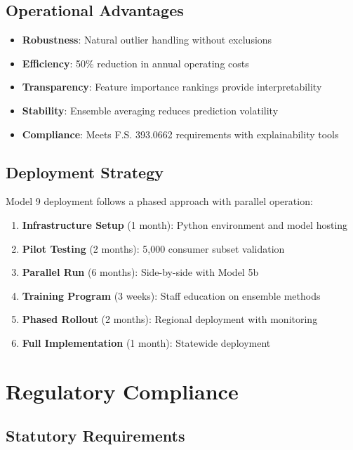 \subsection{Operational Advantages}

\begin{itemize}
    \item \textbf{Robustness}: Natural outlier handling without exclusions
    \item \textbf{Efficiency}: 50\% reduction in annual operating costs
    \item \textbf{Transparency}: Feature importance rankings provide interpretability
    \item \textbf{Stability}: Ensemble averaging reduces prediction volatility
    \item \textbf{Compliance}: Meets F.S. 393.0662 requirements with explainability tools
\end{itemize}

\subsection{Deployment Strategy}

Model 9 deployment follows a phased approach with parallel operation:

\begin{enumerate}
    \item \textbf{Infrastructure Setup} (1 month): Python environment and model hosting
    \item \textbf{Pilot Testing} (2 months): 5,000 consumer subset validation
    \item \textbf{Parallel Run} (6 months): Side-by-side with Model 5b
    \item \textbf{Training Program} (3 weeks): Staff education on ensemble methods
    \item \textbf{Phased Rollout} (2 months): Regional deployment with monitoring
    \item \textbf{Full Implementation} (1 month): Statewide deployment
\end{enumerate}

\section{Regulatory Compliance}

\subsection{Statutory Requirements}

